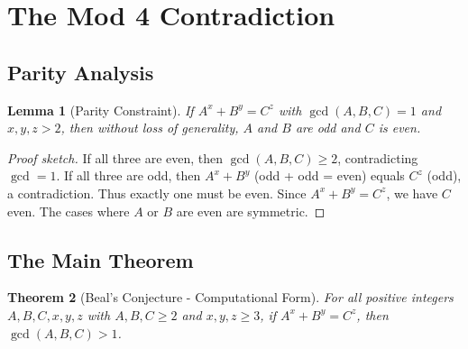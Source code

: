\documentclass[12pt,a4paper]{article}
\newtheorem{theorem}{Theorem}[section]
\newtheorem{lemma}[theorem]{Lemma}
\theoremstyle{definition}
\theoremstyle{remark}
\begin{document}
\section{The Mod 4 Contradiction}
\label{sec:contradiction}

\subsection{Parity Analysis}

\begin{lemma}[Parity Constraint]
\label{lem:parity}
If $A^x + B^y = C^z$ with $\gcd(A,B,C) = 1$ and $x,y,z > 2$, then without loss of generality, $A$ and $B$ are odd and $C$ is even.
\end{lemma}

\begin{proof}[Proof sketch]
If all three are even, then $\gcd(A,B,C) \geq 2$, contradicting $\gcd = 1$. If all three are odd, then $A^x + B^y$ (odd + odd = even) equals $C^z$ (odd), a contradiction. Thus exactly one must be even. Since $A^x + B^y = C^z$, we have $C$ even. The cases where $A$ or $B$ are even are symmetric.
\end{proof}

\subsection{The Main Theorem}

\begin{theorem}[Beal's Conjecture - Computational Form]
\label{thm:beal_main}
For all positive integers $A, B, C, x, y, z$ with $A, B, C \geq 2$ and $x, y, z \geq 3$, if $A^x + B^y = C^z$, then $\gcd(A, B, C) > 1$.
\end{theorem}
\end{document}
